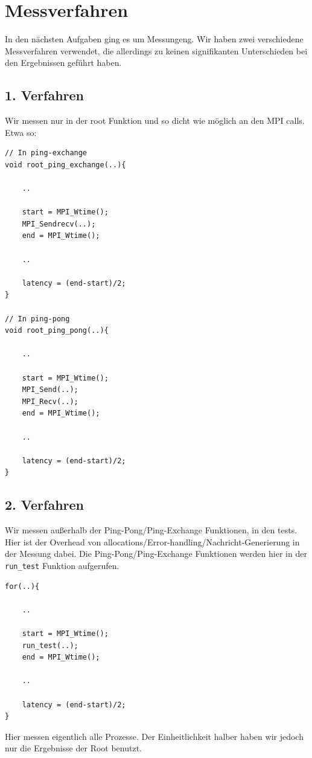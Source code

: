 \documentclass{report}
\begin{document}
\section*{Messverfahren}
In den nächsten Aufgaben ging es um Messungeng. Wir haben zwei verschiedene 
Messverfahren verwendet, die allerdings zu keinen signifikanten Unterschieden 
bei den Ergebnissen geführt haben.
\subsection*{1. Verfahren}
Wir messen nur in der root Funktion und so dicht wie möglich an den MPI calls.
Etwa so:
\begin{lstlisting}
// In ping-exchange
void root_ping_exchange(..){

    ..

    start = MPI_Wtime();
    MPI_Sendrecv(..);
    end = MPI_Wtime();

    ..

    latency = (end-start)/2;
}

// In ping-pong
void root_ping_pong(..){

    ..

    start = MPI_Wtime();
    MPI_Send(..);
    MPI_Recv(..);
    end = MPI_Wtime();

    ..

    latency = (end-start)/2;
}
\end{lstlisting}
\subsection*{2. Verfahren}
Wir messen außerhalb der Ping-Pong/Ping-Exchange Funktionen, in den tests. Hier
ist der Overhead von allocations/Error-handling/Nachricht-Generierung in der 
Messung dabei. Die Ping-Pong/Ping-Exchange Funktionen werden hier in der 
\verb|run_test| Funktion aufgerufen.
\begin{lstlisting}
for(..){

    ..

    start = MPI_Wtime();
    run_test(..);
    end = MPI_Wtime();

    ..

    latency = (end-start)/2;
}
\end{lstlisting}
Hier messen eigentlich alle Prozesse. Der Einheitlichkeit halber haben wir 
jedoch nur die Ergebnisse der Root benutzt.
\newpage
\end{document}
